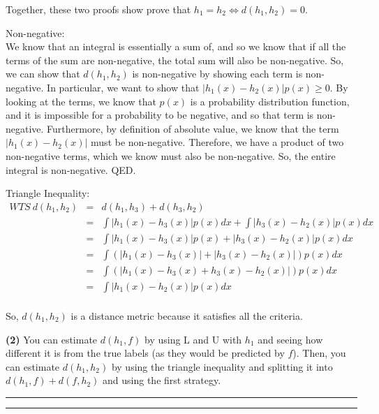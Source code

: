 \documentclass[11pt]{article}
\newcommand{\question}[2] {\vspace{.25in} \hrule\vspace{0.5em}
\noindent{\bf #1: #2} \vspace{0.5em}
\hrule \vspace{.10in}}
\renewcommand{\part}[1] {\vspace{.10in} {\bf (#1)}}
\begin{document}
Together, these two proofs show prove that $h_1 = h_2 \iff d(h_1, h_2) = 0$. 



Non-negative:\\
We know that an integral is essentially a sum of, and so we know that if all the terms of the sum are non-negative, the total sum will also be non-negative. So, we can show that $d(h_1, h_2)$ is non-negative by showing each term is non-negative. In particular, we want to show that $|h_1(x) - h_2(x)|p(x) \geq 0$. By looking at the terms, we know that $p(x)$ is a probability distribution function, and it is impossible for a probability to be negative, and so that term is non-negative. Furthermore, by definition of absolute value, we know that the term $|h_1(x) - h_2(x)|$ must be non-negative. Therefore, we have a product of two non-negative terms, which we know must also be non-negative. So, the entire integral is non-negative. QED.

Triangle Inequality:\\
\begin{eqnarray*}
WTS \ d(h_1, h_2) &=& d(h_1, h_3) + d(h_3, h_2)\\
&=& \int |h_1(x) - h_3(x)|p(x)dx +  \int |h_3(x) - h_2(x)|p(x)dx\\
&=& \int |h_1(x) - h_3(x)|p(x) + |h_3(x) - h_2(x)|p(x)dx\\
&=& \int (|h_1(x) - h_3(x)| + |h_3(x) - h_2(x)|)p(x)dx\\
&=& \int (|h_1(x) - h_3(x) + h_3(x) - h_2(x)|)p(x)dx\\
&=& \int |h_1(x) - h_2(x)|p(x)dx\\
\end{eqnarray*}

So, $d(h_1, h_2)$ is a distance metric because it satisfies all the criteria.

\part{2}
You can estimate $d(h_1, f)$ by using L and U with $h_1$ and seeing how different it is from the true labels (as they would be predicted by $f$). Then, you can estimate $d(h_1, h_2)$ by using the triangle inequality and splitting it into $d(h_1, f) + d(f, h_2)$ and using the first strategy.

\question{3.b}{Semi-Supervised Learning}
\end{document}
